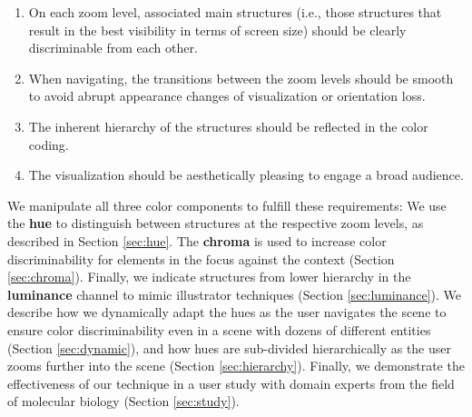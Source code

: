 \documentclass[review,journal]{vgtc}         %
\begin{document}
	\begin{enumerate}
		\item On each zoom level, associated main structures (i.e., those structures that result in the best visibility in terms of screen size) should be clearly discriminable from each other. 
		\item When navigating, the transitions between the zoom levels should be smooth to avoid abrupt appearance changes of visualization or orientation loss. 
		\item The inherent hierarchy of the structures should be reflected in the color coding. 
		\item The visualization should be aesthetically pleasing to engage a broad audience. 
	\end{enumerate}
	
	We manipulate all three color components to fulfill these requirements: 
	We use the \textbf{hue} to distinguish between structures at the respective zoom levels, as described in Section \ref{sec:hue}. 
	The \textbf{chroma} is used to increase color discriminability for elements in the focus against the context (Section \ref{sec:chroma}). 
	Finally, we indicate structures from lower hierarchy in the \textbf{luminance} channel to mimic illustrator techniques (Section \ref{sec:luminance}). 
	We describe how we dynamically adapt the hues as the user navigates the scene to ensure color discriminability even in a scene with dozens of different entities (Section \ref{sec:dynamic}), and how hues are sub-divided hierarchically as the user zooms further into the scene (Section \ref{sec:hierarchy}). 
	Finally, we demonstrate the effectiveness of our technique in a user study with domain experts from the field of molecular biology (Section \ref{sec:study}). 
	
	
	
\end{document}

